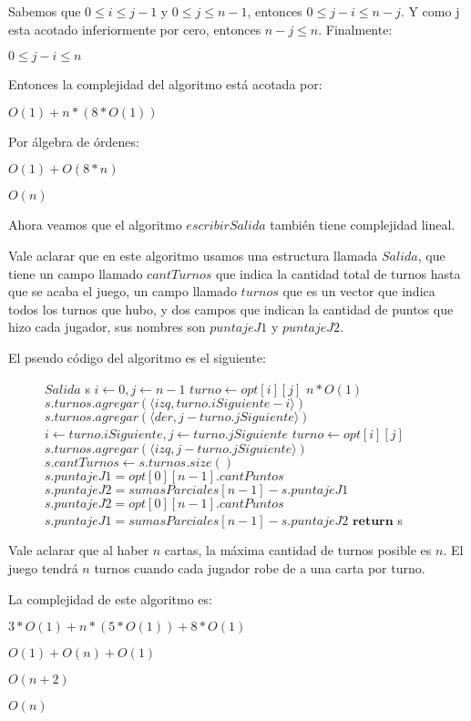 Sabemos que $0 \leq i \leq j-1$ y $0 \leq j \leq n-1$, entonces $0 \leq j-i \leq n-j$. Y como j esta acotado inferiormente por cero, entonces $n-j \leq n$. Finalmente:

$0 \leq j-i \leq n$

Entonces la complejidad del algoritmo está acotada por:

$O(1) + n*(8*O(1))$

Por álgebra de órdenes:

$O(1) + O(8*n)$

$O(n)$

Ahora veamos que el algoritmo $escribirSalida$ también tiene complejidad lineal.

Vale aclarar que en este algoritmo usamos una estructura llamada $Salida$, que tiene un campo llamado $cantTurnos$ que indica la cantidad total de turnos hasta que se acaba el juego, un campo llamado $turnos$ que es un vector que indica todos los turnos que hubo, y dos campos que indican la cantidad de puntos que hizo cada jugador, sus nombres son $puntajeJ1$ y $puntajeJ2$.

El pseudo código del algoritmo es el siguiente:

\begin{center}
 \begin{figure}[H]
  \begin{pseudo}
    \State $Salida$  s 
    \State $i \leftarrow 0, j \leftarrow n-1$ 
    \State $turno \leftarrow opt[i][j]$ 
     \hfill $n*O(1)$
       
	\State $s.turnos.agregar(\langle izq, turno.iSiguiente - i \rangle)$ 
      \Else 
	\State $s.turnos.agregar(\langle der, j - turno.jSiguiente \rangle)$ 
      \EndIf
      \State $i \leftarrow turno.iSiguiente, j \leftarrow turno.jSiguiente$ 
      \State $turno \leftarrow opt[i][j]$ 
    \EndWhile
    \State $s.turnos.agregar(\langle izq, j - turno.jSiguiente \rangle)$ 
    \State $s.cantTurnos \leftarrow s.turnos.size()$ 
     
      \State $s.puntajeJ1 = opt[0][n-1].cantPuntos$ 
      \State $s.puntajeJ2 = sumasParciales[n-1] - s.puntajeJ1$ 
    \Else
      \State $s.puntajeJ2 = opt[0][n-1].cantPuntos$ 
      \State $s.puntajeJ1 = sumasParciales[n-1] - s.puntajeJ2$ 
    \EndIf
    \State $\textbf{return}$ s 
   \EndProcedure
  \end{pseudo}

 \end{figure}

\end{center}

Vale aclarar que al haber $n$ cartas, la máxima cantidad de turnos posible es $n$. El juego tendrá $n$ turnos cuando cada jugador robe de a una carta por turno.

La complejidad de este algoritmo es:

$3*O(1) + n*(5*O(1)) + 8*O(1)$

$O(1) + O(n) + O(1)$

$O(n+2)$

$O(n)$
